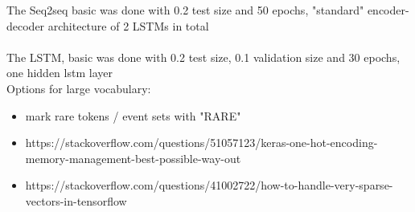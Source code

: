 \documentclass[
	a4paper,
	pagesize,
	pdftex,
	12pt,
	ngerman,
	fleqn,
	final,
	]{scrartcl}
\theoremstyle{plain}
\theoremstyle{definition}
\begin{document}
The Seq2seq basic was done with 0.2 test size and 50 epochs, "standard" encoder-decoder architecture of 2 LSTMs in total \\
\\
The LSTM, basic was done with 0.2 test size, 0.1 validation size and 30 epochs, one hidden lstm layer \\
Options for large vocabulary: \\
\begin{itemize}
	\item mark rare tokens / event sets with "RARE"
	\item https://stackoverflow.com/questions/51057123/keras-one-hot-encoding-memory-management-best-possible-way-out
	\item https://stackoverflow.com/questions/41002722/how-to-handle-very-sparse-vectors-in-tensorflow
\end{itemize}

\newpage %




\selbstaendigkeitserklaerung{\today}
\end{document}
